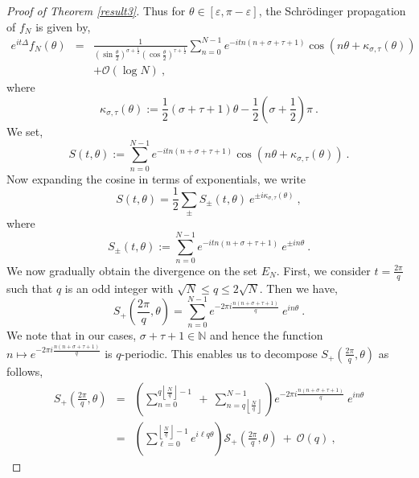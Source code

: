 \documentclass[12pt]{amsart}
\theoremstyle{definition}
\newcommand{\N}{\mathbb N}%
\numberwithin{equation}{section}
\begin{document}
\begin{proof}[Proof of Theorem \ref{result3}]
Thus for $\theta \in [\varepsilon,\pi-\varepsilon]$, the Schr\"odinger propagation of $f_N$ is given by,
\begin{eqnarray} \label{result3_pf_eq2}
e^{it\Delta} f_N(\theta)&=&\frac{1}{\left(\sin\frac{\theta}{2}\right)^{\sigma+\frac{1}{2}}\left(\cos\frac{\theta}{2}\right)^{\tau+\frac{1}{2}}} \sum_{n=0}^{N-1} e^{-itn(n+\sigma+\tau+1)}\cos\left(n\theta+\kappa_{\sigma,\tau}(\theta)\right)\nonumber\\
&&+\mathcal{O}(\log N)\:,
\end{eqnarray}
where
\begin{equation*} 
\kappa_{\sigma,\tau}(\theta):= \frac{1}{2}(\sigma + \tau +1)\theta - \frac{1}{2}\left(\sigma + \frac{1}{2}\right)\pi \:.
\end{equation*}
We set,
\begin{equation*}
S(t,\theta):= \sum_{n=0}^{N-1} e^{-itn(n+\sigma+\tau+1)}\cos\left(n\theta+\kappa_{\sigma,\tau}(\theta)\right)\:.
\end{equation*}
Now expanding the cosine in terms of exponentials, we write
\begin{equation} \label{St}
S(t,\theta)= \frac{1}{2} \sum_{\pm} S_{\pm}(t,\theta)\:e^{\pm i \kappa_{\sigma ,\tau}(\theta)}\:,
\end{equation}
where 
\begin{equation*}
S_{\pm}(t,\theta) := \sum_{n=0}^{N-1} e^{-itn(n+\sigma+\tau+1)} \:e^{\pm in\theta}\:.
\end{equation*}
We now gradually obtain the divergence on the set $E_N$. First, we consider $t=\frac{2\pi}{q}$ such that $q$ is an odd integer with $\sqrt{N} \le q \le 2\sqrt{N}$. Then we have,
\begin{equation*}
S_+\left(\frac{2\pi}{q},\theta\right)= \sum_{n=0}^{N-1} e^{-2\pi i \frac{n(n+\sigma+\tau+1)}{q}} \:e^{in\theta}\:.
\end{equation*}
We note that in our cases, $\sigma + \tau +1 \in \N$ and hence the function $n \mapsto e^{-2\pi i \frac{n(n+\sigma+\tau+1)}{q}}$ is $q$-periodic. This enables us to decompose $S_+\left(\frac{2\pi}{q},\theta\right)$ as follows,
\begin{eqnarray} \label{result3_pf_eq3} 
S_+\left(\frac{2\pi}{q},\theta\right)&=& \left(\sum_{n=0}^{q\left\lfloor\frac{N}{q}\right\rfloor - 1} \:+\: \sum_{n=q\left\lfloor\frac{N}{q}\right\rfloor}^{N-1}\right)e^{-2\pi i \frac{n(n+\sigma+\tau+1)}{q}} \:e^{in\theta}\nonumber\\
&=& \left(\sum_{\ell=0}^{\left\lfloor\frac{N}{q}\right\rfloor - 1} e^{i\ell q \theta}\right)\mathscr{S}_+\left(\frac{2\pi}{q},\theta\right)\:+\: \mathcal{O}(q)\:,

\end{eqnarray}
\end{proof}
\end{document}
